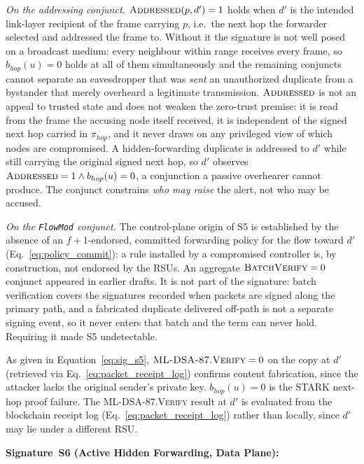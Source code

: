 \documentclass[12pt, a4paper]{report}
\begin{document}
\textit{On the addressing conjunct.} $\textsc{Addressed}(p,d')=1$ holds when
$d'$ is the intended link-layer recipient of the frame carrying $p$, i.e.\ the
next hop the forwarder selected and addressed the frame to. Without it the
signature is not well posed on a broadcast medium: every neighbour within range
receives every frame, so $b_{hop}(u)=0$ holds at all of them simultaneously and
the remaining conjuncts cannot separate an eavesdropper that was \emph{sent} an
unauthorized duplicate from a bystander that merely overheard a legitimate
transmission. $\textsc{Addressed}$ is not an
appeal to trusted state and does not weaken the zero-trust premise: it is read
from the frame the accusing node itself received, it is independent of the
signed next hop carried in $\pi_{hop}$, and it never draws on any privileged
view of which nodes are compromised. A hidden-forwarding duplicate is addressed
to $d'$ while still carrying the original signed next hop, so $d'$ observes
$\textsc{Addressed}=1 \wedge b_{hop}(u)=0$, a conjunction a passive overhearer
cannot produce. The conjunct constrains \emph{who may raise} the alert, not who
may be accused.

\textit{On the \texttt{FlowMod} conjunct.} The control-plane origin of S5 is
established by the absence of an $f{+}1$-endorsed, committed forwarding policy
for the flow toward $d'$ (Eq.~\ref{eq:policy_commit}): a rule installed by a
compromised controller is, by construction, not endorsed by the \ac{RSU}s. An
aggregate $\textsc{BatchVerify}=0$ conjunct appeared in earlier drafts. It is
not part of the signature: batch verification covers the signatures recorded
when packets are signed along the primary path, and a fabricated duplicate
delivered off-path is not a separate signing event, so it never enters that
batch and the term can never hold. Requiring it made S5 undetectable.

As given in Equation~\eqref{eq:sig_s5},
$\textsc{ML-DSA-87.Verify}=0$ on the copy at $d'$
(retrieved via Eq.~\ref{eq:packet_receipt_log})
confirms content fabrication, since the attacker lacks
the original sender's private key.
$b_{hop}(u) = 0$ is the \ac{STARK} next-hop proof
failure. The \textsc{ML-DSA-87.Verify} result at $d'$
is evaluated from the blockchain receipt log
(Eq.~\ref{eq:packet_receipt_log}) rather than locally,
since $d'$ may lie under a different \ac{RSU}.



\textbf{Signature~S6 (Active Hidden Forwarding, Data Plane):}
\end{document}
